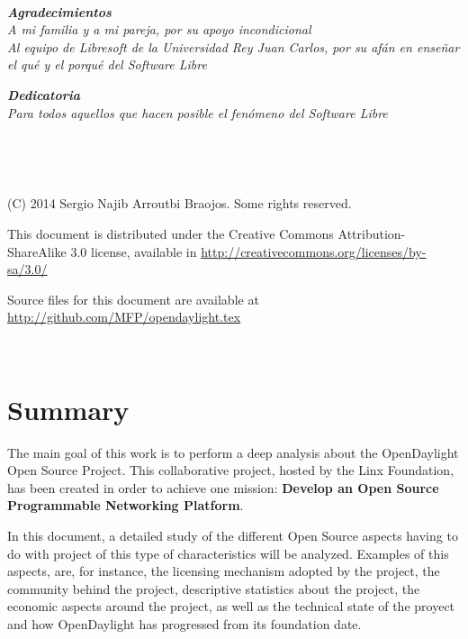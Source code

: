 \documentclass[a4paper, 12pt]{book}
\begin{document}
\newpage
~
\thispagestyle{empty}
\vspace{3cm}
\begin{flushright}
\textbf{\textit{Agradecimientos}} \\
\textit{A mi familia y a mi pareja, por su apoyo incondicional\\
Al equipo de Libresoft de la Universidad Rey Juan Carlos,
por su afán en enseñar el qué y el porqué del Software Libre}
\vspace{2cm}

\textbf{\textit{Dedicatoria}} \\
\textit{Para todos aquellos que hacen posible el fenómeno del Software Libre}
\end{flushright}

\newpage
~


\newpage
~
\thispagestyle{empty}
\vspace{12cm}
\begin{flushright}

(C) 2014 Sergio Najib Arroutbi Braojos. Some rights reserved.

This document is distributed under the Creative Commons
Attribution-ShareAlike 3.0 license,
available in \url{http://creativecommons.org/licenses/by-sa/3.0/}

Source files for this document are available at
\url{http://github.com/MFP/opendaylight.tex}
\end{flushright}

\newpage
~

\tableofcontents

\listoffigures

\listoftables


\chapter*{Summary}
\label{chap:summary}

The main goal of this work is to perform a deep analysis about the OpenDaylight Open Source Project. This collaborative project, hosted by the Linx Foundation, has been created in order to achieve one mission: \textbf{Develop an Open Source Programmable Networking Platform}.

In this document, a detailed study of the different Open Source aspects having to do with project of this type of characteristics will be analyzed. Examples of this aspects, are, for instance, the licensing mechanism adopted by the project, the community behind the project, descriptive statistics about the project, the economic aspects around the project, as well as the technical state of the proyect and how OpenDaylight has progressed from its foundation date.
\end{document}
